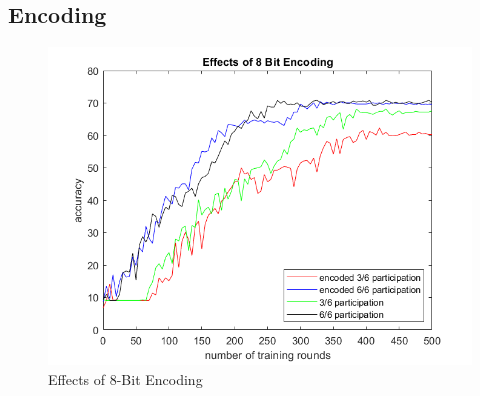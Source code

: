 \documentclass[11pt]{article}
\begin{document}
\subsection{Encoding}

\begin{figure}[h!]
\centering
  \includegraphics[scale=0.5]{encoding}
  \caption{Effects of 8-Bit Encoding}
  \label{fig:encoding}
\end{figure}
\end{document}
